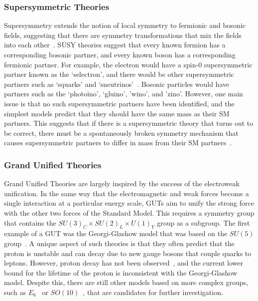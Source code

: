 \subsubsection{Supersymmetric Theories}

Supersymmetry extends the notion of local symmetry to fermionic and bosonic fields, suggesting that there are symmetry transformations that mix the fields into each other~\cite{Wess197452}.
SUSY theories suggest that every known fermion has a corresponding bosonic partner, and every known boson has a corresponding fermionic partner.
For example, the electron would have a spin-0 supersymmetric partner known as the `selectron', and there would be other supersymmetric partners such as `squarks' and `sneutrinos'~\cite{Martin_1998}.
Bosonic particles would have partners such as the `photoino', `gluino', 'wino', and 'zino'.
However, one main issue is that no such supersymmetric partners have been identified, and the simplest models predict that they should have the same mass as their SM partners. %
This suggests that if there is a supersymmetric theory that turns out to be correct, there must be a spontaneously broken symmetry mechanism that causes supersymmetric partners to differ in mass from their SM partners~\cite{dine_2007}.

\subsubsection{Grand Unified Theories}

Grand Unified Theories are largely inspired by the success of the electroweak unification.
In the same way that the electromagnetic and weak forces become a single interaction at a particular energy scale, GUTs aim to unify the strong force with the other two forces of the Standard Model.
This requires a symmetry group that contains the $SU(3)_C\times SU(2)_L\times U(1)_Y$ group as a subgroup.
The first example of a GUT was the Georgi-Glashow model that was based on the $SU(5)$ group~\cite{PhysRevLett.32.438}.
A unique aspect of such theories is that they often predict that the proton is unstable and can decay due to new gauge bosons that couple quarks to leptons\footnotemark.
However, proton decay has not been observed~\cite{PhysRevLett.81.3319}, and the current lower bound for the lifetime of the proton is inconsistent with the Georgi-Glashow model.
Despite this, there are still other models based on more complex groups, such as $E_6$~\cite{Hewett1989193} or $SO(10)$~\cite{Cveti__1997}, that are candidates for further investigation.

